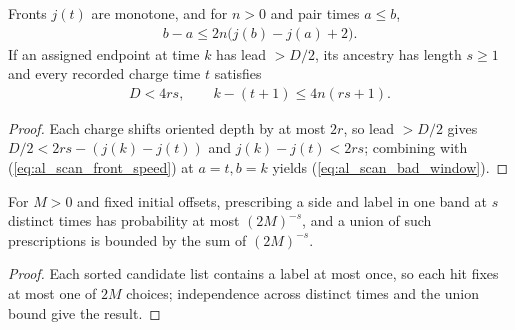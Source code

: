 \begin{lemma}
    \label{thm:al_scan_ancestry_window}
    \leanok
    Fronts $j(t)$ are monotone, and for $n>0$ and pair times $a\le b$,
    \begin{align}
        b-a\le 2n\bigl(j(b)-j(a)+2\bigr).
        \label{eq:al_scan_front_speed}
    \end{align}
    If an assigned endpoint at time $k$ has lead $>D/2$, its ancestry has length $s\ge1$ and every recorded charge time $t$ satisfies
    \begin{align}
        D<4rs,\qquad k-(t+1)\le 4n(rs+1).
        \label{eq:al_scan_bad_window}
    \end{align}
\end{lemma}
\begin{proof}\leanok
    Each charge shifts oriented depth by at most $2r$, so lead $>D/2$ gives $D/2<2rs-(j(k)-j(t))$ and $j(k)-j(t)<2rs$; combining with (\ref{eq:al_scan_front_speed}) at $a=t,b=k$ yields (\ref{eq:al_scan_bad_window}).
\end{proof}

\begin{lemma}
    \label{thm:al_scan_selected_chain_probability}
    \leanok
    For $M>0$ and fixed initial offsets, prescribing a side and label in one band at $s$ distinct times has probability at most $(2M)^{-s}$, and a union of such prescriptions is bounded by the sum of $(2M)^{-s}$.
\end{lemma}
\begin{proof}\leanok
    Each sorted candidate list contains a label at most once, so each hit fixes at most one of $2M$ choices; independence across distinct times and the union bound give the result.
\end{proof}

